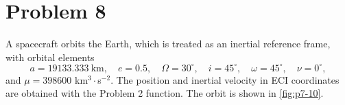 \section{Problem 8}
\label{sec:problem8}

A spacecraft orbits the Earth, which is treated as an inertial reference frame, with orbital elements
\[
a = 19133.333\ \text{km}, \quad e = 0.5, \quad \Omega = 30^\circ, \quad i = 45^\circ, \quad \omega = 45^\circ, \quad \nu = 0^\circ,
\]
and $\mu = 398600$ km$^3\cdot$s$^{-2}$. The position and inertial velocity in ECI coordinates are obtained with the Problem 2 function. The orbit is shown in \cref{fig:p7-10}.


\FloatBarrier
